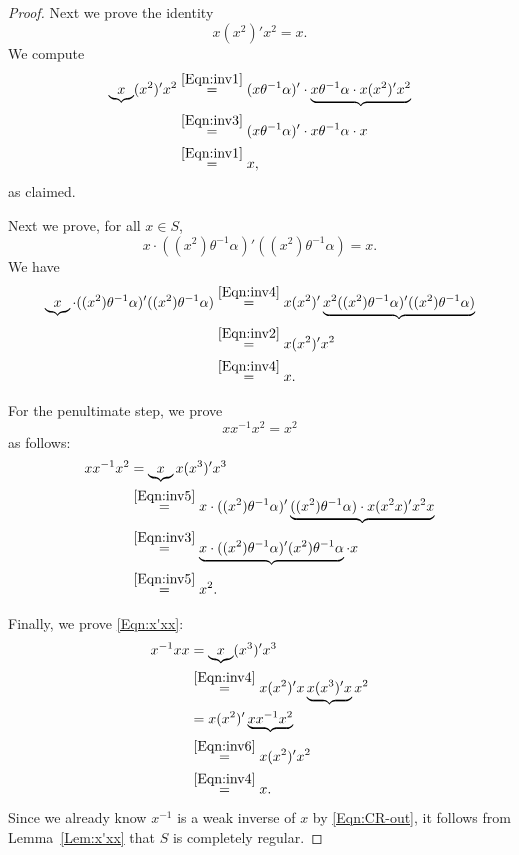 \documentclass[11pt]{article}
\theoremstyle{plain}
\theoremstyle{remark}
\theoremstyle{definition}
\theoremstyle{plain}
\newcommand{\byeqn}[1]{\overset{\eqref{#1}}{=}}
\newcommand{\inv}{^{-1}}
\begin{document}
\begin{proof}
Next we prove the identity
\begin{equation}\label{Eqn:inv4}
x(x^2)'x^2 = x.
\end{equation}
We compute
\begin{align*}
\underbrace{x}(x^2)'x^2 &\byeqn{Eqn:inv1} (x\theta\inv\alpha)'\cdot \underbrace{x\theta\inv\alpha\cdot x(x^2)'x^2} \\
&\byeqn{Eqn:inv3} (x\theta\inv\alpha)'\cdot x\theta\inv\alpha\cdot x \\
&\byeqn{Eqn:inv1} x,
\end{align*}
as claimed.

Next we prove, for all $x\in S$,
\begin{equation}\label{Eqn:inv5}
x\cdot ((x^2)\theta\inv\alpha)'((x^2)\theta\inv\alpha) = x.
\end{equation}
We have
\begin{align*}
\underbrace{x}\cdot ((x^2)\theta\inv\alpha)'((x^2)\theta\inv\alpha)
    &\byeqn{Eqn:inv4} x(x^2)' \underbrace{x^2((x^2)\theta\inv\alpha)'((x^2)\theta\inv\alpha)} \\
    &\byeqn{Eqn:inv2} x(x^2)'x^2 \\
    &\byeqn{Eqn:inv4} x.
\end{align*}

For the penultimate step, we prove
\begin{equation}\label{Eqn:inv6}
x x\inv x^2 = x^2
\end{equation}
as follows:
\begin{align*}
x x\inv x^2 &= \underbrace{x} x(x^3)' x^3 \\
&\byeqn{Eqn:inv5} x\cdot ((x^2)\theta\inv\alpha)'\underbrace{((x^2)\theta\inv\alpha)\cdot x(x^2x)'x^2x} \\
&\byeqn{Eqn:inv3} \underbrace{x\cdot ((x^2)\theta\inv\alpha)'(x^2)\theta\inv{\alpha}}\cdot x \\
&\byeqn{Eqn:inv5} x^2.
\end{align*}

Finally, we prove \eqref{Eqn:x'xx}:
\begin{align*}
x\inv xx &= \underbrace{x}(x^3)'x^3 \\
&\byeqn{Eqn:inv4} x(x^2)'x\underbrace{x(x^3)'x}x^2 \\
&= x(x^2)'\underbrace{xx\inv x^2} \\
&\byeqn{Eqn:inv6} x(x^2)'x^2 \\
&\byeqn{Eqn:inv4} x.
\end{align*}
Since we already know $x\inv$ is a weak inverse of $x$ by \eqref{Eqn:CR-out}, it follows from Lemma~\ref{Lem:x'xx} that $S$ is completely regular.
\end{proof}
\end{document}
